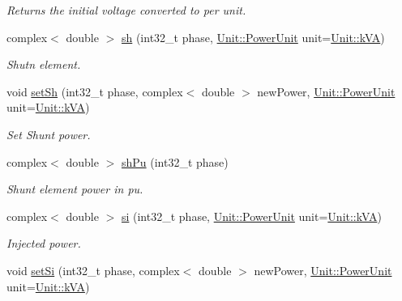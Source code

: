\begin{DoxyCompactItemize}
\begin{DoxyCompactList}\small\item\em Returns the initial voltage converted to per unit. \end{DoxyCompactList}\item 
complex$<$ double $>$ \hyperlink{group___models_gac188071bf5f165b0acdaa4c8af82355c}{sh} (int32\+\_\+t phase, \hyperlink{class_unit_ace265ae255370ccacfd5370337572c3b}{Unit\+::\+Power\+Unit} unit=\hyperlink{class_unit_ace265ae255370ccacfd5370337572c3ba72b181a842ae2759488a2fa1410d3696}{Unit\+::k\+V\+A})
\begin{DoxyCompactList}\small\item\em Shutn element. \end{DoxyCompactList}\item 
void \hyperlink{group___models_ga207abd3d0649a488e3c44cf2a501ed23}{set\+Sh} (int32\+\_\+t phase, complex$<$ double $>$ new\+Power, \hyperlink{class_unit_ace265ae255370ccacfd5370337572c3b}{Unit\+::\+Power\+Unit} unit=\hyperlink{class_unit_ace265ae255370ccacfd5370337572c3ba72b181a842ae2759488a2fa1410d3696}{Unit\+::k\+V\+A})
\begin{DoxyCompactList}\small\item\em Set Shunt power. \end{DoxyCompactList}\item 
complex$<$ double $>$ \hyperlink{group___models_ga7df2ed5705f06c0cf2937d25102ca847}{sh\+Pu} (int32\+\_\+t phase)
\begin{DoxyCompactList}\small\item\em Shunt element power in pu. \end{DoxyCompactList}\item 
complex$<$ double $>$ \hyperlink{group___models_ga02bbc279f1e133f66b12ee21e7bebcd8}{si} (int32\+\_\+t phase, \hyperlink{class_unit_ace265ae255370ccacfd5370337572c3b}{Unit\+::\+Power\+Unit} unit=\hyperlink{class_unit_ace265ae255370ccacfd5370337572c3ba72b181a842ae2759488a2fa1410d3696}{Unit\+::k\+V\+A})
\begin{DoxyCompactList}\small\item\em Injected power. \end{DoxyCompactList}\item 
void \hyperlink{group___models_ga74e510be49e50e4c14550b32e1dc92f9}{set\+Si} (int32\+\_\+t phase, complex$<$ double $>$ new\+Power, \hyperlink{class_unit_ace265ae255370ccacfd5370337572c3b}{Unit\+::\+Power\+Unit} unit=\hyperlink{class_unit_ace265ae255370ccacfd5370337572c3ba72b181a842ae2759488a2fa1410d3696}{Unit\+::k\+V\+A})

\end{DoxyCompactItemize}
